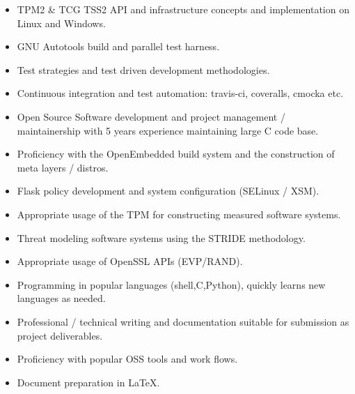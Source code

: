 \documentclass[letterpaper,11pt]{article}
\begin{document}
\begin {itemize}
  \setlength {\itemsep}{1pt}
  \setlength {\parskip}{0pt}
  \setlength {\parsep}{0pt}
  \item TPM2 \& TCG TSS2 API and infrastructure concepts and implementation
    on Linux and Windows.
  \item GNU Autotools build and parallel test harness.
  \item Test strategies and test driven development methodologies.
  \item Continuous integration and test automation: travis-ci, coveralls,
    cmocka etc.
  \item Open Source Software development and project management /
    maintainership with 5 years experience maintaining large C code
    base.
  \item Proficiency with the OpenEmbedded build system and the construction of meta layers / distros.
  \item Flask policy development and system configuration (SELinux / XSM).
  \item Appropriate usage of the TPM for constructing measured software systems.
  \item Threat modeling software systems using the STRIDE methodology.
  \item Appropriate usage of OpenSSL APIs (EVP/RAND).
  \item Programming in popular languages (shell,C,Python), quickly learns new languages as needed.
  \item Professional / technical writing and documentation suitable for submission as project deliverables.
  \item Proficiency with popular OSS tools and work flows.
  \item Document preparation in \LaTeX.
\end {itemize}
\end{document}
